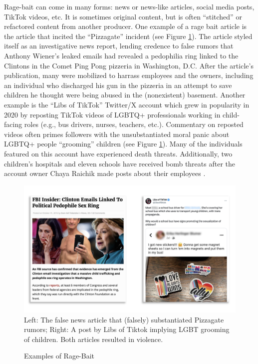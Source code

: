 Rage-bait can come in many forms: news or news-like articles, social media posts, TikTok videos, etc. It is sometimes original content, but is often ``stitched'' or refactored content from another producer. One example of a rage bait article is the article that incited the ``Pizzagate'' incident (see Figure \ref{fig:example}). The article styled itself as an investigative news report, lending credence to false rumors that Anthony Wiener's leaked emails had revealed a pedophilia ring linked to the Clintons in the Comet Ping Pong pizzeria in Washington, D.C. After the article's publication, many were mobilized to harrass employees and the owners, including an individual who discharged his gun in the pizzeria in an attempt to save children he thought were being abused in the (nonexistent) basement. Another example is the ``Libs of TikTok'' Twitter/X account which grew in popularity in 2020 by reposting TikTok videos of LGBTQ+ professionals working in child-facing roles (e.g., bus drivers, nurses, teachers, etc.). Commentary on reposted videos often primes followers with the unsubstantiated moral panic about LGBTQ+ people ``grooming'' children (see Figure \ref{fig:example}). Many of the individuals featured on this account have experienced death threats. Additionally, two children's hospitals and eleven schools have received bomb threats after the account owner Chaya Raichik made posts about their employees \citep{yang2022boston, lorenz2022lgbt, anguiano2023california}.

\begin{figure}[h]
  \centering
  \caption{Examples of Rage-Bait}
  \includegraphics[width=\textwidth]{figures/rage_bait_examples.png}
  \label{fig:example}
  {\footnotesize Left: The false news article that (falsely) substantiated Pizzagate rumors; Right: A post by Libs of Tiktok implying LGBT grooming of children. Both articles resulted in violence.}
\end{figure}

